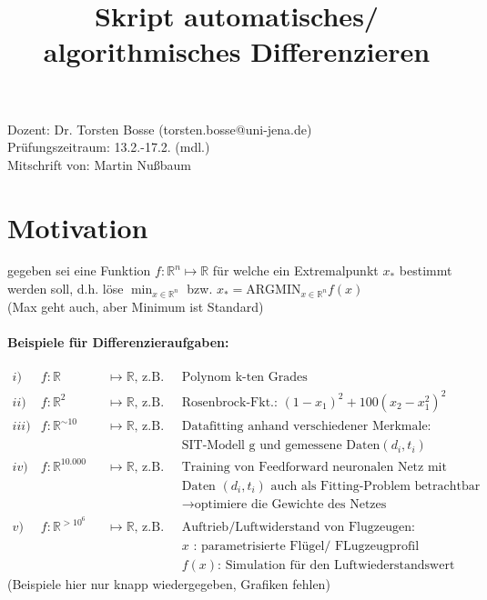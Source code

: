 \tableofcontents

\title{Skript automatisches/ algorithmisches Differenzieren}

\vspace{1cm}
\noindent Dozent: Dr. Torsten Bosse (torsten.bosse@uni-jena.de)\\
Prüfungszeitraum: 13.2.-17.2. (mdl.)\\
Mitschrift von: Martin Nußbaum
\vspace{1cm}


\section{Motivation}
\label{chap:Motivation}


gegeben sei eine Funktion $f: \mathbb{R}^n \mapsto \mathbb{R}$ für welche ein Extremalpunkt $x_*$ bestimmt werden soll, d.h. löse
$\min_{x \in \mathbb{R}^n}$ bzw. $x_* = \text{ARGMIN}_{x \in \mathbb{R}^n} f(x)$\\
(Max geht auch, aber Minimum ist Standard)

\paragraph{Beispiele für Differenzieraufgaben:}
\begin{align*}
	i) & f:\mathbb{R} &&\mapsto \mathbb{R} \text{, z.B.} &&\text{Polynom k-ten Grades}
	\\
	ii) & f:\mathbb{R}^2 &&\mapsto \mathbb{R} \text{, z.B.} &&\text{Rosenbrock-Fkt.: } (1-x_1)^2 +100 (x_2-x_1^2)^2
	\\
	iii) & f:\mathbb{R}^{\sim10} &&\mapsto \mathbb{R} \text{, z.B.} &&\text{Datafitting anhand verschiedener Merkmale:}\\
	 & && &&\text{SIT-Modell g und gemessene Daten} (d_i,t_i)
	\\
	iv) & f:\mathbb{R}^{10.000} &&\mapsto \mathbb{R} \text{, z.B.} &&\text{Training von Feedforward neuronalen Netz mit den}\\
	 & && &&\text{Daten } (d_i, t_i) \text{ auch als Fitting-Problem betrachtbar}\\
	 & && &&\rightarrow\text{optimiere die Gewichte des Netzes}
	\\
	v) & f:\mathbb{R}^{>10^6} &&\mapsto \mathbb{R} \text{, z.B.} &&\text{Auftrieb/Luftwiderstand von Flugzeugen:}\\
	& && && x\text{  :  parametrisierte Flügel/ FLugzeugprofil}\\
	& && &&f(x)\text{: Simulation für den Luftwiederstandswert}
\end{align*}
(Beispiele hier nur knapp wiedergegeben, Grafiken fehlen)


